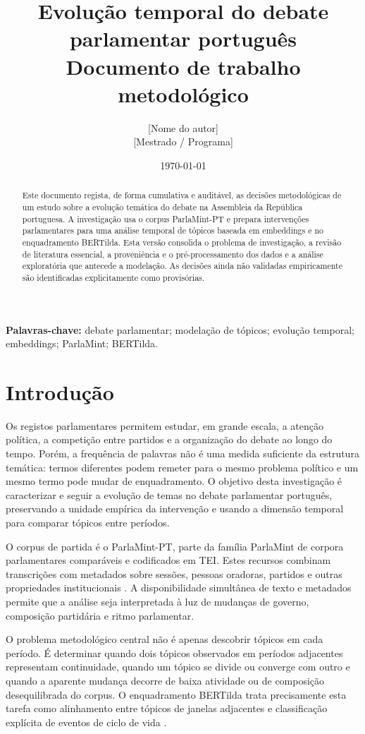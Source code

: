 \documentclass[11pt,a4paper]{article}
\title{Evolução temporal do debate parlamentar português\\\large Documento de trabalho metodológico}
\author{[Nome do autor]\\[0.25em][Mestrado / Programa]\\[Instituição]}
\date{\today}
\begin{document}
\maketitle

\begin{abstract}
Este documento regista, de forma cumulativa e auditável, as decisões metodológicas de um estudo sobre a evolução temática do debate na Assembleia da República portuguesa. A investigação usa o corpus ParlaMint-PT e prepara intervenções parlamentares para uma análise temporal de tópicos baseada em embeddings e no enquadramento BERTilda. Esta versão consolida o problema de investigação, a revisão de literatura essencial, a proveniência e o pré-processamento dos dados e a análise exploratória que antecede a modelação. As decisões ainda não validadas empiricamente são identificadas explicitamente como provisórias.
\end{abstract}

\noindent\textbf{Palavras-chave:} debate parlamentar; modelação de tópicos; evolução temporal; embeddings; ParlaMint; BERTilda.

\tableofcontents
\newpage

\section{Introdução}

Os registos parlamentares permitem estudar, em grande escala, a atenção política, a competição entre partidos e a organização do debate ao longo do tempo. Porém, a frequência de palavras não é uma medida suficiente da estrutura temática: termos diferentes podem remeter para o mesmo problema político e um mesmo termo pode mudar de enquadramento. O objetivo desta investigação é caracterizar e seguir a evolução de temas no debate parlamentar português, preservando a unidade empírica da intervenção e usando a dimensão temporal para comparar tópicos entre períodos.

O corpus de partida é o ParlaMint-PT, parte da família ParlaMint de corpora parlamentares comparáveis e codificados em TEI. Estes recursos combinam transcrições com metadados sobre sessões, pessoas oradoras, partidos e outras propriedades institucionais \citep{erjavec2023parlamint}. A disponibilidade simultânea de texto e metadados permite que a análise seja interpretada à luz de mudanças de governo, composição partidária e ritmo parlamentar.

O problema metodológico central não é apenas descobrir tópicos em cada período. É determinar quando dois tópicos observados em períodos adjacentes representam continuidade, quando um tópico se divide ou converge com outro e quando a aparente mudança decorre de baixa atividade ou de composição desequilibrada do corpus. O enquadramento BERTilda trata precisamente esta tarefa como alinhamento entre tópicos de janelas adjacentes e classificação explícita de eventos de ciclo de vida \citep{oliveirafigueira2026bertilda}.
\end{document}
